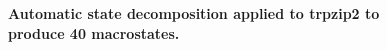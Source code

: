 \begin{figure}[tb]
  \begin{center}
  \end{center}
  \caption{{\bf Automatic state decomposition applied to trpzip2 to produce 40 macrostates.}}
  \label{automatic:figure:trpzip2-allstates}
\end{figure}
